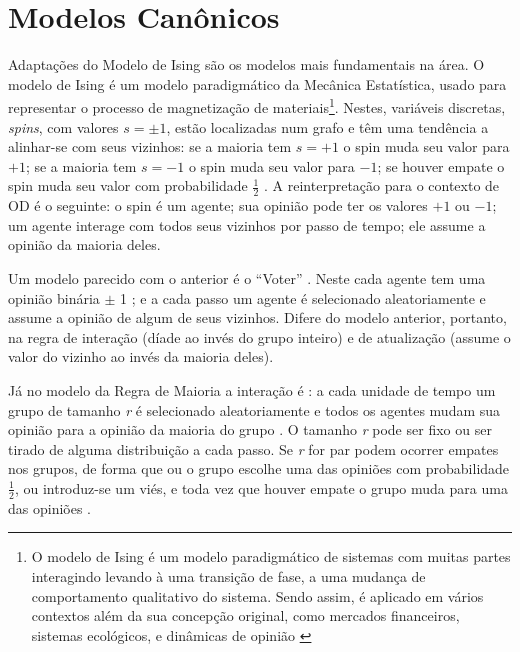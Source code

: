   

  \section{Modelos Canônicos}

  Adaptações do Modelo de Ising são os modelos mais fundamentais na área. O
  modelo de Ising é um modelo paradigmático da Mecânica Estatística, usado para
  representar o processo de magnetização de materiais\footnote{O modelo de Ising
    é um modelo paradigmático de sistemas com muitas partes interagindo levando
    à uma transição de fase, a uma mudança de comportamento qualitativo do
    sistema. Sendo assim, é aplicado em vários contextos além da sua concepção
    original, como mercados financeiros, sistemas ecológicos, e dinâmicas de
    opinião \cite{sole2011phase}}. Nestes, variáveis discretas, \textit{spins},
  com valores $s = \pm 1$, estão localizadas num grafo e têm uma tendência a
  alinhar-se com seus vizinhos: se a maioria tem \(s = + 1 \) o spin muda seu
  valor para \(+1\); se a maioria tem \(s = -1 \) o spin muda seu valor para
  \(-1\); se houver empate o spin muda seu valor com probabilidade
  \(\frac{1}{2}\) \cite{castellano2012social,sole2011phase}. A reinterpretação
  para o contexto de OD é o seguinte: o spin é um agente; sua opinião pode ter
  os valores \(+1\) ou \(-1\); um agente interage com todos seus vizinhos por
  passo de tempo; ele assume a opinião da maioria deles.

  Um modelo parecido com o anterior é o ``Voter'' \cite{holley1975ergodic}. Neste
  cada agente tem uma opinião binária \(\pm\) 1 ; e a cada passo um agente é
  selecionado aleatoriamente e assume a opinião de algum de seus vizinhos.
  Difere do modelo anterior, portanto, na regra de interação (díade ao invés do
  grupo inteiro) e de atualização (assume o valor do vizinho ao invés da maioria
  deles).


  Já no modelo da Regra de Maioria a interação é : a cada
  unidade de tempo um grupo
  de tamanho \textit{r} é selecionado aleatoriamente e todos os agentes mudam
  sua opinião para a opinião da maioria do grupo
  \cite{galam1990social,galam2012sociophysics}. O tamanho \textit{r} pode ser
  fixo ou ser tirado de alguma distribuição a cada passo. Se \textit{r} for par
  podem ocorrer empates nos grupos, de forma que ou o grupo escolhe uma das
  opiniões com probabilidade \(\frac{1}{2}\), ou introduz-se um viés, e toda vez
  que houver empate o grupo muda para uma das opiniões
  \cite{galam2012sociophysics, galam1986majority}.

